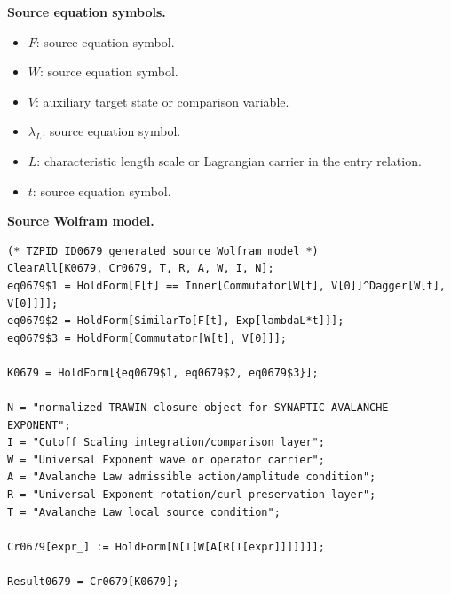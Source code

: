 \begin{minipage}[t]{0.49\linewidth}
\begingroup
\small
\raggedright
\textbf{Source equation symbols.}\par
\begin{itemize}[leftmargin=1.35em,itemsep=1pt,topsep=1pt,parsep=0pt]
    \item $F$: source equation symbol.
    \item $W$: source equation symbol.
    \item $V$: auxiliary target state or comparison variable.
    \item $\lambda_L$: source equation symbol.
    \item $L$: characteristic length scale or Lagrangian carrier in the entry relation.
    \item $t$: source equation symbol.
\end{itemize}
\endgroup
\end{minipage}\hfill
\begin{minipage}[t]{0.47\linewidth}
\begingroup
\scriptsize
\raggedright
\textbf{Source Wolfram model.}\par
\begin{Verbatim}[fontsize=\tiny,breaklines=true,breakanywhere=true]
(* TZPID ID0679 generated source Wolfram model *)
ClearAll[K0679, Cr0679, T, R, A, W, I, N];
eq0679$1 = HoldForm[F[t] == Inner[Commutator[W[t], V[0]]^Dagger[W[t], V[0]]]];
eq0679$2 = HoldForm[SimilarTo[F[t], Exp[lambdaL*t]]];
eq0679$3 = HoldForm[Commutator[W[t], V[0]]];

K0679 = HoldForm[{eq0679$1, eq0679$2, eq0679$3}];

N = "normalized TRAWIN closure object for SYNAPTIC AVALANCHE EXPONENT";
I = "Cutoff Scaling integration/comparison layer";
W = "Universal Exponent wave or operator carrier";
A = "Avalanche Law admissible action/amplitude condition";
R = "Universal Exponent rotation/curl preservation layer";
T = "Avalanche Law local source condition";

Cr0679[expr_] := HoldForm[N[I[W[A[R[T[expr]]]]]]];

Result0679 = Cr0679[K0679];
\end{Verbatim}
\endgroup
\end{minipage}

